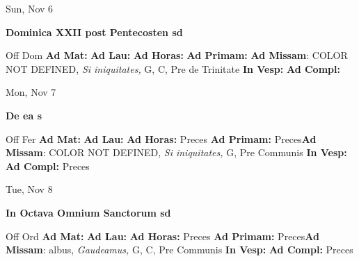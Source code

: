 \documentclass[10pt]{memoir}
\begin{document}
\begin{center}
\begin{minipage}{3.5in}
\vspace{2em}
\begin{center}Sun, Nov 6
\end{center}
\textbf{ \large Dominica XXII post Pentecosten
\textnormal{\normalsize sd}}

\begin{justify}Off Dom
\textbf{Ad Mat: }
\textbf{Ad Lau: }
\textbf{Ad Horas: }
\textbf{Ad Primam: }\textbf{Ad Missam}: COLOR NOT DEFINED, \textit{Si iniquitates,} G, C, Pre de Trinitate
\textbf{In Vesp: }
\textbf{Ad Compl: }
\end{justify}
\end{minipage}
\end{center}

\begin{center}
\begin{minipage}{3.5in}
\vspace{2em}
\begin{center}Mon, Nov 7
\end{center}
\textbf{ \large De ea
\textnormal{\normalsize s}}

\begin{justify}Off Fer
\textbf{Ad Mat: }
\textbf{Ad Lau: }
\textbf{Ad Horas: }Preces
\textbf{Ad Primam: }Preces\textbf{Ad Missam}: COLOR NOT DEFINED, \textit{Si iniquitates,} G, Pre Communis
\textbf{In Vesp: }
\textbf{Ad Compl: }Preces
\end{justify}
\end{minipage}
\end{center}

\begin{center}
\begin{minipage}{3.5in}
\vspace{2em}
\begin{center}Tue, Nov 8
\end{center}
\textbf{ \large In Octava Omnium Sanctorum
\textnormal{\normalsize sd}}

\begin{justify}Off Ord
\textbf{Ad Mat: }
\textbf{Ad Lau: }
\textbf{Ad Horas: }Preces
\textbf{Ad Primam: }Preces\textbf{Ad Missam}: albus, \textit{Gaudeamus,} G, C, Pre Communis
\textbf{In Vesp: }
\textbf{Ad Compl: }Preces
\end{justify}
\end{minipage}
\end{center}
\end{document}
